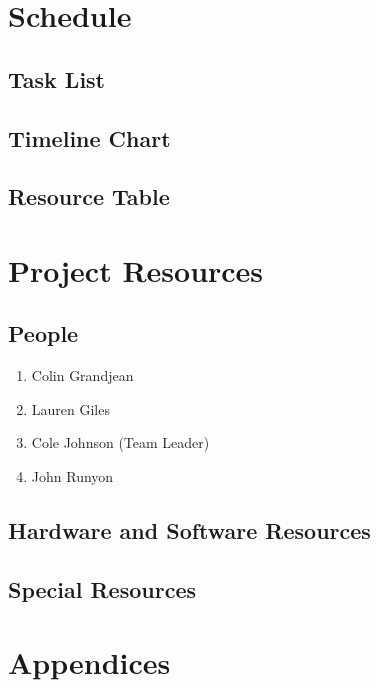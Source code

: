 \documentclass[english,12pt]{article}
\begin{document}
\section{Schedule}

\subsection{Task List}

\subsection{Timeline Chart}

\subsection{Resource Table}

\section{Project Resources}

\subsection{People}
\begin{enumerate}
  \item Colin Grandjean 
  \item Lauren Giles   
  \item Cole Johnson (Team Leader)
  \item John Runyon    
\end{enumerate}
\subsection{Hardware and Software Resources}

\subsection{Special Resources}

\section{Appendices}
\end{document}
